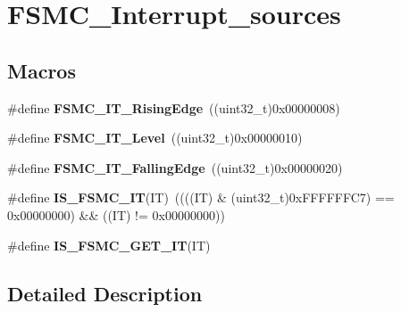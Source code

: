 \hypertarget{group___f_s_m_c___interrupt__sources}{\section{F\-S\-M\-C\-\_\-\-Interrupt\-\_\-sources}
\label{group___f_s_m_c___interrupt__sources}
}
\subsection*{Macros}
\begin{DoxyCompactItemize}
\item 
\hypertarget{group___f_s_m_c___interrupt__sources_gac483854bd6f90d8c7899a597a0c0ab1a}{\#define {\bfseries F\-S\-M\-C\-\_\-\-I\-T\-\_\-\-Rising\-Edge}~((uint32\-\_\-t)0x00000008)}\label{group___f_s_m_c___interrupt__sources_gac483854bd6f90d8c7899a597a0c0ab1a}

\item 
\hypertarget{group___f_s_m_c___interrupt__sources_ga59b5839854074008fb36fa86ec50a0c7}{\#define {\bfseries F\-S\-M\-C\-\_\-\-I\-T\-\_\-\-Level}~((uint32\-\_\-t)0x00000010)}\label{group___f_s_m_c___interrupt__sources_ga59b5839854074008fb36fa86ec50a0c7}

\item 
\hypertarget{group___f_s_m_c___interrupt__sources_ga8e4b9589c9981c900b5f2e84581a9693}{\#define {\bfseries F\-S\-M\-C\-\_\-\-I\-T\-\_\-\-Falling\-Edge}~((uint32\-\_\-t)0x00000020)}\label{group___f_s_m_c___interrupt__sources_ga8e4b9589c9981c900b5f2e84581a9693}

\item 
\hypertarget{group___f_s_m_c___interrupt__sources_ga40a38f097a75f27a700e626905fa9a38}{\#define {\bfseries I\-S\-\_\-\-F\-S\-M\-C\-\_\-\-I\-T}(I\-T)~((((I\-T) \& (uint32\-\_\-t)0x\-F\-F\-F\-F\-F\-F\-C7) == 0x00000000) \&\& ((\-I\-T) != 0x00000000))}\label{group___f_s_m_c___interrupt__sources_ga40a38f097a75f27a700e626905fa9a38}

\item 
\#define {\bfseries I\-S\-\_\-\-F\-S\-M\-C\-\_\-\-G\-E\-T\-\_\-\-I\-T}(I\-T)
\end{DoxyCompactItemize}


\subsection{Detailed Description}


